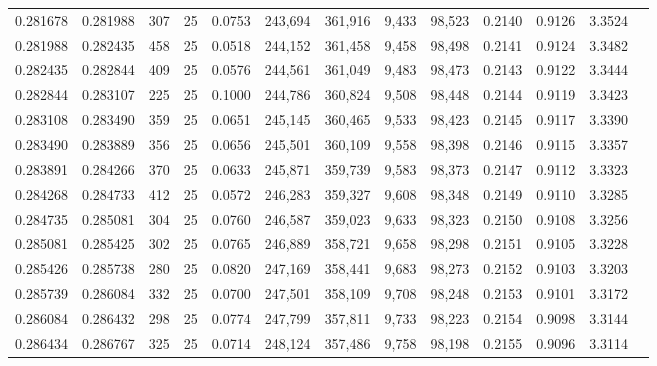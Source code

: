 \begin{tabular}{rrrrrrrrrrrrr}
0.281678 & 0.281988 &   307 &  25 &                                     0.0753 & 243,694 & 361,916 &   9,433 &  98,523 & 0.2140 & 0.9126 & 3.3524 \\
0.281988 & 0.282435 &   458 &  25 &                                     0.0518 & 244,152 & 361,458 &   9,458 &  98,498 & 0.2141 & 0.9124 & 3.3482 \\
0.282435 & 0.282844 &   409 &  25 &                                     0.0576 & 244,561 & 361,049 &   9,483 &  98,473 & 0.2143 & 0.9122 & 3.3444 \\
0.282844 & 0.283107 &   225 &  25 &                                     0.1000 & 244,786 & 360,824 &   9,508 &  98,448 & 0.2144 & 0.9119 & 3.3423 \\
0.283108 & 0.283490 &   359 &  25 &                                     0.0651 & 245,145 & 360,465 &   9,533 &  98,423 & 0.2145 & 0.9117 & 3.3390 \\
0.283490 & 0.283889 &   356 &  25 &                                     0.0656 & 245,501 & 360,109 &   9,558 &  98,398 & 0.2146 & 0.9115 & 3.3357 \\
0.283891 & 0.284266 &   370 &  25 &                                     0.0633 & 245,871 & 359,739 &   9,583 &  98,373 & 0.2147 & 0.9112 & 3.3323 \\
0.284268 & 0.284733 &   412 &  25 &                                     0.0572 & 246,283 & 359,327 &   9,608 &  98,348 & 0.2149 & 0.9110 & 3.3285 \\
0.284735 & 0.285081 &   304 &  25 &                                     0.0760 & 246,587 & 359,023 &   9,633 &  98,323 & 0.2150 & 0.9108 & 3.3256 \\
0.285081 & 0.285425 &   302 &  25 &                                     0.0765 & 246,889 & 358,721 &   9,658 &  98,298 & 0.2151 & 0.9105 & 3.3228 \\
0.285426 & 0.285738 &   280 &  25 &                                     0.0820 & 247,169 & 358,441 &   9,683 &  98,273 & 0.2152 & 0.9103 & 3.3203 \\
0.285739 & 0.286084 &   332 &  25 &                                     0.0700 & 247,501 & 358,109 &   9,708 &  98,248 & 0.2153 & 0.9101 & 3.3172 \\
0.286084 & 0.286432 &   298 &  25 &                                     0.0774 & 247,799 & 357,811 &   9,733 &  98,223 & 0.2154 & 0.9098 & 3.3144 \\
0.286434 & 0.286767 &   325 &  25 &                                     0.0714 & 248,124 & 357,486 &   9,758 &  98,198 & 0.2155 & 0.9096 & 3.3114 \\

\end{tabular}
